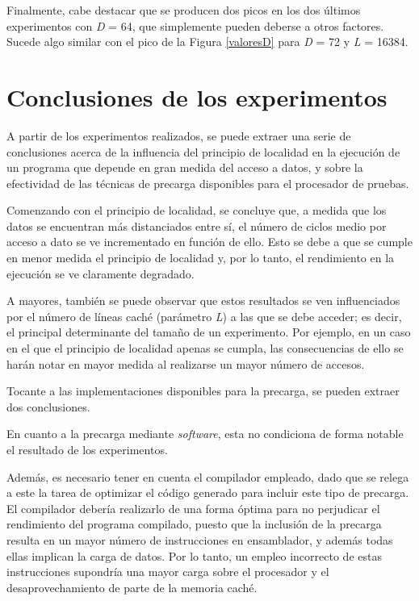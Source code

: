 \documentclass[conference]{IEEEtran}
\begin{document}
Finalmente, cabe destacar que se producen dos picos en los dos últimos experimentos con \textit{D} = 64, que simplemente pueden deberse a otros factores. Sucede algo similar con el pico de la Figura \ref{valoresD} para \textit{D} = 72 y \textit{L} = 16384.

\section{Conclusiones de los experimentos} \label{resumenExperimentos}

A partir de los experimentos realizados, se puede extraer una serie de conclusiones acerca de la influencia del principio de localidad en la ejecución de un programa que depende en gran medida del acceso a datos, y sobre la efectividad de las técnicas de precarga disponibles para el procesador de pruebas.

Comenzando con el principio de localidad, se concluye que, a medida que los datos se encuentran más distanciados entre sí, el número de ciclos medio por acceso a dato se ve incrementado en función de ello. Esto se debe a que se cumple en menor medida el principio de localidad y, por lo tanto, el rendimiento en la ejecución se ve claramente degradado.

A mayores, también se puede observar que estos resultados se ven influenciados por el número de líneas caché (parámetro \textit{L}) a las que se debe acceder; es decir, el principal determinante del tamaño de un experimento. Por ejemplo, en un caso en el que el principio de localidad apenas se cumpla, las consecuencias de ello se harán notar en mayor medida al realizarse un mayor número de accesos.

Tocante a las implementaciones disponibles para la precarga, se pueden extraer dos conclusiones.

En cuanto a la precarga mediante \textit{software}, esta no condiciona de forma notable el resultado de los experimentos.

Además, es necesario tener en cuenta el compilador empleado, dado que se relega a este la tarea de optimizar el código generado para incluir este tipo de precarga. El compilador debería realizarlo de una forma óptima para no perjudicar el rendimiento del programa compilado, puesto que la inclusión de la precarga resulta en un mayor número de instrucciones en ensamblador, y además todas ellas implican la carga de datos. Por lo tanto, un empleo incorrecto de estas instrucciones supondría una mayor carga sobre el procesador y el desaprovechamiento de parte de la memoria caché.
\end{document}

